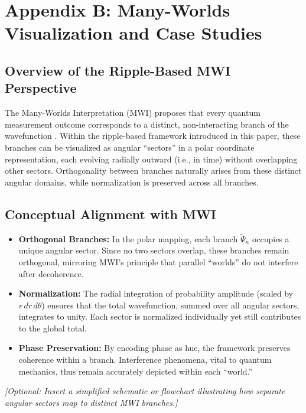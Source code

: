 \section{Appendix B: Many-Worlds Visualization and Case Studies}
\label{appendix:B}

\subsection{Overview of the Ripple-Based MWI Perspective}
The Many-Worlds Interpretation (MWI) proposes that every quantum measurement outcome corresponds to a distinct, non-interacting branch of the wavefunction \citep{everett1957}. Within the ripple-based framework introduced in this paper, these branches can be visualized as angular “sectors” in a polar coordinate representation, each evolving radially outward (i.e., in time) without overlapping other sectors. Orthogonality between branches naturally arises from these distinct angular domains, while normalization is preserved across all branches.

\subsection{Conceptual Alignment with MWI}
\begin{itemize}
    \item \textbf{Orthogonal Branches:}
    In the polar mapping, each branch \(\tilde{\Psi}_n\) occupies a unique angular sector. Since no two sectors overlap, these branches remain orthogonal, mirroring MWI’s principle that parallel “worlds” do not interfere after decoherence.
    \item \textbf{Normalization:}
    The radial integration of probability amplitude (scaled by \(r\,dr\,d\theta\)) ensures that the total wavefunction, summed over all angular sectors, integrates to unity. Each sector is normalized individually yet still contributes to the global total.
    \item \textbf{Phase Preservation:}
    By encoding phase as hue, the framework preserves coherence within a branch. Interference phenomena, vital to quantum mechanics, thus remain accurately depicted within each “world.”
\end{itemize}

\noindent
\textit{[Optional: Insert a simplified schematic or flowchart illustrating how separate angular sectors map to distinct MWI branches.]}



